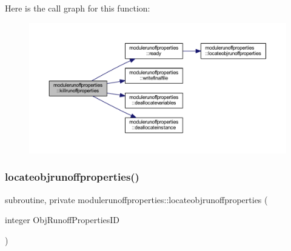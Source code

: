 Here is the call graph for this function\+:\nopagebreak
\begin{figure}[H]
\begin{center}
\leavevmode
\includegraphics[width=350pt]{namespacemodulerunoffproperties_ae0e5362eaddb64340c7e7f7c80f73e3e_cgraph}
\end{center}
\end{figure}
\mbox{\label{namespacemodulerunoffproperties_adf7480277becbdd9d386b2941df91200}} 
\subsubsection{\texorpdfstring{locateobjrunoffproperties()}{locateobjrunoffproperties()}}
{\footnotesize\ttfamily subroutine, private modulerunoffproperties\+::locateobjrunoffproperties (\begin{DoxyParamCaption}\item[{integer}]{Obj\+Runoff\+Properties\+ID }\end{DoxyParamCaption})\hspace{0.3cm}{\ttfamily [private]}}

